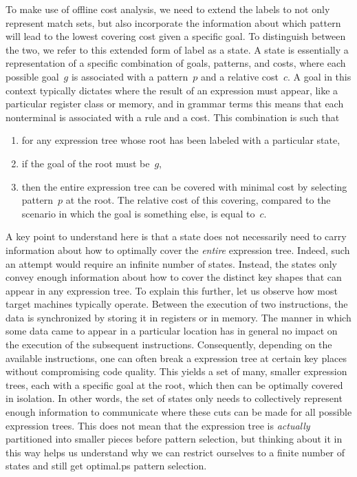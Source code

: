 To make use of \gls{offline cost analysis}, we need to extend the labels to not
only represent \glspl{match set}, but also incorporate the information about
which \gls{pattern} will lead to the lowest covering cost given a specific goal.
%
To distinguish between the two, we refer to this extended form of label as a
\gls{state}.
%
A \gls{state} is essentially a representation of a specific combination of
goals, \glspl{pattern}, and costs, where each possible goal~$g$ is associated
with a \gls{pattern}~$p$ and a relative cost~$c$.
%
A goal in this context typically dictates where the result of an expression must
appear, like a particular \gls{register class} or memory, and in \gls{grammar}
terms this means that each \gls{nonterminal} is associated with a \gls{rule} and
a cost.
%
This combination is such that
%
\begin{enumerate}
  \item for any \gls{expression tree} whose \gls{root} has been labeled with a
    particular \gls{state},
  \item if the goal of the \gls{root} must be~$g$,
  \item then the entire \gls{expression tree} can be covered with minimal cost
    by selecting \gls{pattern}~$p$ at the \gls{root}.
    The relative cost of this covering, compared to the scenario in which the
    goal is something else, is equal to~$c$.
\end{enumerate}

A key point to understand here is that a \gls{state} does not necessarily need
to carry information about how to optimally cover the \emph{entire}
\gls{expression tree}.
%
Indeed, such an attempt would require an infinite number of \glspl{state}.
%
Instead, the \glspl{state} only convey enough information about how to cover the
distinct key shapes that can appear in any \gls{expression tree}.
%
To explain this further, let us observe how most \glspl{target machine}
typically operate.
%
Between the execution of two \glspl{instruction}, the data is synchronized by
storing it in \glspl{register} or in memory.
%
The manner in which some data came to appear in a particular location has in
general no impact on the execution of the subsequent \glspl{instruction}.
%
Consequently, depending on the available \glspl{instruction}, one can often
break a \gls{expression tree} at certain key places without compromising code
quality.
%
This yields a set of many, smaller \glspl{expression tree}, each with a specific
goal at the \gls{root}, which then can be optimally covered in isolation.
%
In other words, the set of \glspl{state} only needs to collectively represent
enough information to communicate where these cuts can be made for all possible
\glspl{expression tree}.
%
This does not mean that the \gls{expression tree} is \emph{actually} partitioned
into smaller pieces before \gls{pattern selection}, but thinking about it in
this way helps us understand why we can restrict ourselves to a finite number of
\glspl{state} and still get \gls{optimal.ps} \gls{pattern selection}.

